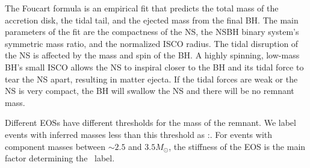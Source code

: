 The Foucart formula is an empirical fit that predicts the total mass of the accretion disk, the tidal tail, and the ejected mass from the final \ac{BH}. The main parameters of the fit are
the compactness of the \ac{NS},  the \ac{NSBH} binary system's symmetric mass ratio, and the normalized \ac{ISCO} radius. The tidal disruption of the \ac{NS} is affected by the mass and spin of the \ac{BH}. A highly spinning, low-mass \ac{BH}'s small ISCO allows the \ac{NS} to inspiral closer to the \ac{BH} and its tidal force to tear the \ac{NS} apart, resulting in matter ejecta. If the tidal forces are weak or the \ac{NS} is very compact, the \ac{BH} will swallow the \ac{NS} and there will be no remnant mass.

Different \ac{EOS}s have different thresholds for the mass of the remnant. We label events with inferred masses less than this threshold as \hasrem:\true. For events with component masses between $\sim 2.5$ and $3.5 M_{\odot}$, the stiffness of the \ac{EOS} is the main factor determining the \hasrem\ label.
